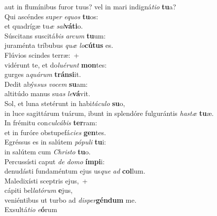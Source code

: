 \evenverse aut in flumínibus furor tuus? vel in mari indigná\textit{ti}\textit{o} \textbf{tu}a?\\
\oddverse Qui ascéndes su\textit{per} \textit{e}\textit{quos} \textbf{tu}os:~\*\\
\oddverse et quadrígæ tu\textit{æ} \textit{sal}\textbf{vá}\textbf{ti}o.\\
\evenverse Súscitans suscitá\textit{bis} \textit{ar}\textit{cum} \textbf{tu}um:~\*\\
\evenverse juraménta tríbubus \textit{quæ} \textit{lo}\textbf{cú}\textbf{tus} es.\\
\oddverse Flúvios scindes terræ:~+\\
\oddverse  vidérunt te, et do\textit{lu}\textit{é}\textit{runt} \textbf{mon}tes:~\*\\
\oddverse gurges a\textit{quá}\textit{rum} \textbf{trán}\textbf{si}it.\\
\evenverse Dedit abýs\textit{sus} \textit{vo}\textit{cem} \textbf{su}am:~\*\\
\evenverse altitúdo manus su\textit{as} \textit{le}\textbf{vá}vit.\\
\oddverse Sol, et luna stetérunt in habi\textit{tá}\textit{cu}\textit{lo} \textbf{su}o,~\*\\
\oddverse in luce sagittárum tuárum, ibunt in splendóre fulgurántis \textit{ha}\textit{stæ} \textbf{tu}æ.\\
\evenverse In frémitu con\textit{cul}\textit{cá}\textit{bis} \textbf{ter}ram:~\*\\
\evenverse et in furóre obstupefá\textit{ci}\textit{es} \textbf{gen}tes.\\
\oddverse Egréssus es in salútem \textit{pó}\textit{pu}\textit{li} \textbf{tu}i:~\*\\
\oddverse in salútem cum \textit{Chri}\textit{sto} \textbf{tu}o.\\
\evenverse Percussísti caput \textit{de} \textit{do}\textit{mo} \textbf{ím}\textbf{pi}i:~\*\\
\evenverse denudásti fundaméntum ejus us\textit{que} \textit{ad} \textbf{col}lum.\\
\oddverse Maledixísti sceptris ejus,~+\\
\oddverse  cápiti bel\textit{la}\textit{tó}\textit{rum} \textbf{e}jus,~\*\\
\oddverse veniéntibus ut turbo ad \textit{di}\textit{sper}\textbf{gén}\textbf{dum} me.\\
\evenverse Exsultá\textit{ti}\textit{o} \textit{e}\textbf{ó}rum~\*\\
